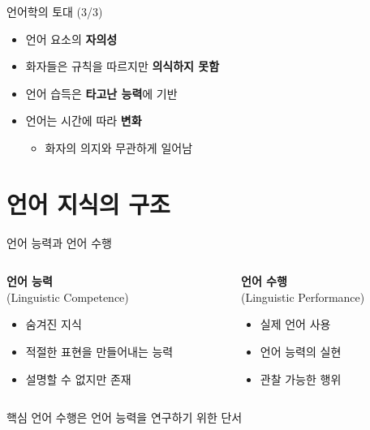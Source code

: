 \documentclass[aspectratio=169]{beamer}
\begin{document}
\begin{frame}{언어학의 토대 (3/3)}
\begin{itemize}
\item 언어 요소의 \textbf{자의성}
\item 화자들은 규칙을 따르지만 \textbf{의식하지 못함}
\item 언어 습득은 \textbf{타고난 능력}에 기반
\item 언어는 시간에 따라 \textbf{변화}
    \begin{itemize}
    \item 화자의 의지와 무관하게 일어남
    \end{itemize}
\end{itemize}
\end{frame}

\section{언어 지식의 구조}

\begin{frame}{언어 능력과 언어 수행}
\begin{columns}
\begin{column}{0.5\textwidth}
\textbf{언어 능력}\\
(Linguistic Competence)
\begin{itemize}
\item 숨겨진 지식
\item 적절한 표현을 만들어내는 능력
\item 설명할 수 없지만 존재
\end{itemize}
\end{column}
\begin{column}{0.5\textwidth}
\textbf{언어 수행}\\
(Linguistic Performance)
\begin{itemize}
\item 실제 언어 사용
\item 언어 능력의 실현
\item 관찰 가능한 행위
\end{itemize}
\end{column}
\end{columns}

\vspace{0.5cm}
\begin{block}{핵심}
언어 수행은 언어 능력을 연구하기 위한 단서
\end{block}
\end{frame}
\end{document}
